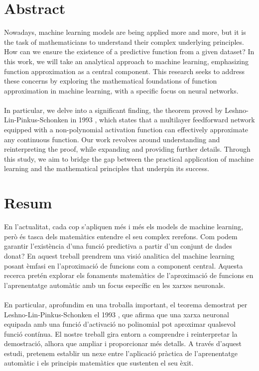 \documentclass[../../main.tex]{subfiles}
\begin{document}
\section*{Abstract} %


\noindent Nowadays, machine learning models are being applied more and more, but it is the task of mathematicians to understand their complex underlying principles. How can we ensure the existence of a predictive function from a given dataset? In this work, we will take an analytical approach to machine learning, emphasizing function approximation as a central component. This research seeks to address these concerns by exploring the mathematical foundations of function approximation in machine learning, with a specific focus on neural networks.
\\ \\
In particular, we delve into a significant finding, the theorem proved by Leshno-Lin-Pinkus-Schonken in 1993 \cite{leshno1993multilayer}, which states that a multilayer feedforward network equipped with a non-polynomial activation function can effectively approximate any continuous function. Our work revolves around understanding and reinterpreting the proof, while expanding and providing further details.
Through this study, we aim to bridge the gap between the practical application of machine learning and the mathematical principles that underpin its success.

\newpage

\section*{Resum}
\noindent En l'actualitat, cada cop s'apliquen més i més els models de machine learning, però és tasca dels matemàtics entendre el seu complex rerefons. Com podem garantir l'existència d'una funció predictiva a partir d'un conjunt de dades donat?  En aquest treball prendrem una visió analitica del machine learning posant èmfasi en l'aproximació de funcions com a component central. Aquesta recerca pretén explorar els fonaments matemàtics de l'aproximació de funcions en l'aprenentatge automàtic amb un focus específic en les xarxes neuronals.
\\ \\
\noindent En particular, aprofundim en una troballa important, el teorema demostrat per Leshno-Lin-Pinkus-Schonken el 1993 \cite{leshno1993multilayer}, que afirma que una xarxa neuronal equipada amb una funció d'activació no polinomial pot aproximar qualsevol funció contínua. El nostre treball gira entorn a comprendre i reinterpretar la demostració, alhora que ampliar i proporcionar més detalls.
A través d'aquest estudi, pretenem establir un nexe entre l'aplicació pràctica de l'aprenentatge automàtic i els principis matemàtics que sustenten el seu èxit.
\end{document}
